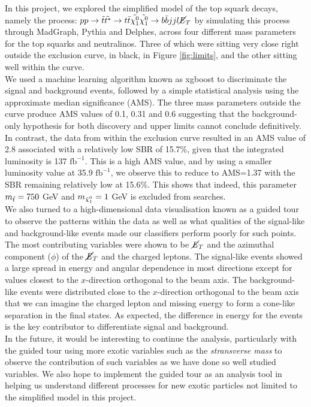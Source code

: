 In this project, we explored the simplified model of the top squark decays, namely the process: $pp \rightarrow \Tilde{t}\Tilde{t^*} \rightarrow t \Bar{t} \Tilde{\chi^0_1}\Tilde{\chi^0_1} \rightarrow b\Bar{b}jjl\cancel{\it{E}}_{T}$ by simulating this process through MadGraph, Pythia and Delphes, across four different mass parameters for the top squarks and neutralinos. Three of which were sitting very close right outside the exclusion curve, in black, in Figure \ref{fig:limits}, and the other sitting well within the curve. \\

We used a machine learning algorithm known as xgboost to discriminate the signal and background events, followed by a simple statistical analysis using the approximate median significance (AMS). The three mass parameters outside the curve produce AMS values of 0.1, 0.31 and 0.6 suggesting that the background-only hypothesis for both discovery and upper limits cannot conclude definitively. In contrast, the data from within the exclusion curve resulted in an AMS value of 2.8 associated with a relatively low SBR of 15.7\%, given that the integrated luminosity is 137 $\text{fb}^{-1}$. This is a high AMS value, and by using a smaller luminosity value at 35.9 $\text{fb}^{-1}$, we observe this to reduce to AMS=1.37 with the SBR remaining relatively low at 15.6\%. This shows that indeed, this parameter $m_{\Tilde{t}} = 750$ GeV and $m_{\Tilde{\chi}_1^0} = 1$ GeV is excluded from searches. \\

We also turned to a high-dimensional data visualisation known as a guided tour to observe the patterns within the data as well as what qualities of the signal-like and background-like events made our classifiers perform poorly for such points. The most contributing variables were shown to be $\cancel{\it{E}}_{T}$ and the azimuthal component ($\phi$) of the $\cancel{\it{E}}_{T}$ and the charged leptons. The signal-like events showed a large spread in energy and angular dependence in most directions except for values closest to the $x$-direction orthogonal to the beam axis. The background-like events were distributed close to the $x$-direction orthogonal to the beam axis that we can imagine the charged lepton and missing energy to form a cone-like separation in the final states. As expected, the difference in energy for the events is the key contributor to differentiate signal and background. \\

In the future, it would be interesting to continue the analysis, particularly with the guided tour using more exotic variables such as the \textit{stransverse mass} to observe the contribution of such variables as we have done so well studied variables. We also hope to implement the guided tour as an analysis tool in helping us understand different processes for new exotic particles not limited to the simplified model in this project.  